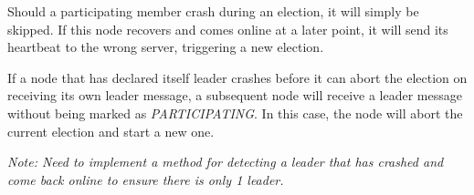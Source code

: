 \documentclass[runningheads]{llncs}
\begin{document}
Should a participating member crash during an election, it will simply be skipped. If this node recovers and comes online at a later point, it will send its heartbeat to the wrong server, triggering a new election.

If a node that has declared itself leader crashes before it can abort the election on receiving its own leader message, a subsequent node will receive a leader message without being marked as \textit{PARTICIPATING}. In this case, the node will abort the current election and start a new one.

\textit{Note: Need to implement a method for detecting a leader that has crashed and come back online to ensure there is only 1 leader.}
\end{document}
